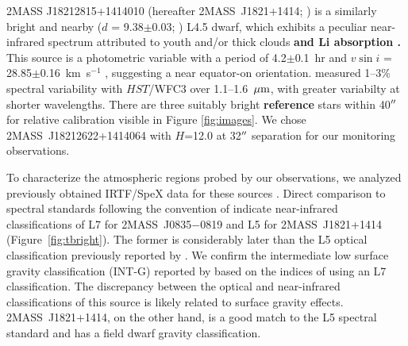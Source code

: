 \documentclass[twocolumn]{aastex6}
\newcommand{\kms}{km~s$^{-1}$}
\newcommand{\sha}{2MASS~J0835$-$0819}
\newcommand{\shb}{2MASS~J1821+1414}
\begin{document}
2MASS J18212815+1414010 (hereafter {\shb}; \citealt{2008ApJ...686..528L}) is a similarly bright and nearby ($d$ = 9.38$\pm$0.03; \citealt{2016MNRAS.455..357S}) L4.5 dwarf, which exhibits a peculiar near-infrared spectrum attributed to youth and/or thick clouds \citep{2008ApJ...686..528L,2015ApJS..219...33G,2016ApJ...833...96L} \textbf{and Li absorption \citep{2008ApJ...686..528L}.}
This source is a photometric variable with a period of 4.2$\pm$0.1~hr \citep{2015ApJ...799..154M} and $v\sin{i}$ = 28.85$\pm$0.16~{\kms}  \citep{2010ApJ...723..684B}, suggesting a near equator-on orientation.  \citet{2015ApJ...798L..13Y} measured 1--3\% spectral variability with $HST$/WFC3 over 1.1--1.6~$\mbox{$\mu$m}$, with greater variabilty at shorter wavelengths.
There are three suitably bright \textbf{reference} stars within 40$\mbox{$^{\prime\prime}$}$ for relative calibration visible in Figure \ref{fig:images}. We chose 2MASS~J18212622+1414064 with $H$=12.0 at 32$\mbox{$^{\prime\prime}$}$ separation for our monitoring observations.

To characterize the atmospheric regions probed by our observations, we analyzed previously 
obtained IRTF/SpeX data for these sources \citep{2008ApJ...686..528L,2010ApJ...710.1142B}.
Direct comparison to spectral standards following the convention of \citet{2010ApJS..190..100K} indicate near-infrared
classifications of L7 for {\sha} and L5 for {\shb} (Figure~\ref{fig:tbright}). The former is considerably later than the L5 optical classification previously reported by \citet{2003AJ....126.2421C}. We confirm the intermediate low surface gravity classification (INT-G) reported by \citet{2016ApJ...833...96L} based on the indices of \citet{2013ApJ...772...79A} using an L7 classification. The discrepancy between the optical and near-infrared classifications of this source is likely related to surface gravity effects. {\shb}, on the other hand, is a good match to the L5 spectral standard and has a field dwarf gravity classification.
\end{document}
